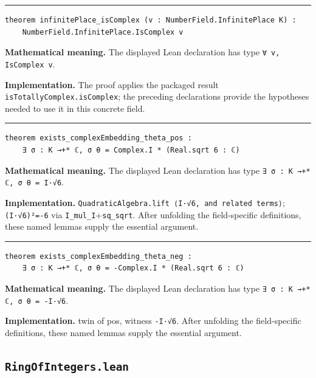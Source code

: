 \documentclass[UTF8,a4paper,11pt,fontset=fandol]{ctexart}
\theoremstyle{definition}
\newcommand{\statementsep}{\par\medskip\hrule\medskip}
\begin{document}
\statementsep
\begin{verbatim}
theorem infinitePlace_isComplex (v : NumberField.InfinitePlace K) :
    NumberField.InfinitePlace.IsComplex v
\end{verbatim}
\noindent\textbf{Mathematical meaning.} The displayed Lean declaration has type \texttt{∀ v, IsComplex v}.\par
\noindent\textbf{Implementation.} The proof applies the packaged result \texttt{isTotallyComplex.\allowbreak{}isComplex}; the preceding declarations provide the hypotheses needed to use it in this concrete field.\par
\statementsep
\begin{verbatim}
theorem exists_complexEmbedding_theta_pos :
    ∃ σ : K →+* ℂ, σ θ = Complex.I * (Real.sqrt 6 : ℂ)
\end{verbatim}
\noindent\textbf{Mathematical meaning.} The displayed Lean declaration has type \texttt{∃ σ : K →+* ℂ, σ θ = I·√6}.\par
\noindent\textbf{Implementation.} \texttt{QuadraticAlgebra.\allowbreak{}lift ⟨I·√6, and related terms⟩}; \texttt{(I·√6)²=-6} via \texttt{I\_\allowbreak{}mul\_\allowbreak{}I}+\texttt{sq\_\allowbreak{}sqrt}. After unfolding the field-specific definitions, these named lemmas supply the essential argument.\par
\statementsep
\begin{verbatim}
theorem exists_complexEmbedding_theta_neg :
    ∃ σ : K →+* ℂ, σ θ = -Complex.I * (Real.sqrt 6 : ℂ)
\end{verbatim}
\noindent\textbf{Mathematical meaning.} The displayed Lean declaration has type \texttt{∃ σ : K →+* ℂ, σ θ = -I·√6}.\par
\noindent\textbf{Implementation.} twin of pos, witness \texttt{-I·√6}. After unfolding the field-specific definitions, these named lemmas supply the essential argument.\par

\subsection{\texttt{RingOfIntegers.lean}}
\end{document}
